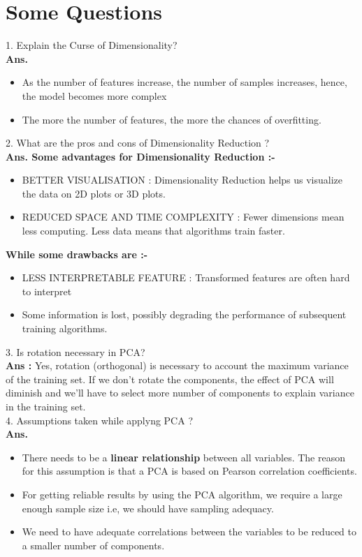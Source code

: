 \documentclass[a4paper, 11pt]{article}
\begin{document}
\section{Some Questions}
1. Explain the Curse of Dimensionality?\\
\textbf{Ans.}  \begin{itemize}
    \item  As the number of features increase, the number of samples increases, hence, the model becomes more complex
    \item The more the number of features, the more the chances of overfitting. 
\end{itemize}
2. What are the pros and cons of Dimensionality Reduction ? \\
\textbf{Ans. Some advantages for Dimensionality Reduction :-} 
\begin{itemize}
\item BETTER VISUALISATION : Dimensionality Reduction helps us visualize the data on 2D plots or 3D plots.
 \item REDUCED SPACE AND TIME COMPLEXITY : Fewer dimensions mean less computing. Less data means that algorithms train faster.
\end{itemize}
\pagebreak
\textbf{While some drawbacks are :-}
\begin{itemize}
    \item LESS INTERPRETABLE FEATURE : Transformed features are often hard to interpret
     \item Some information is lost, possibly degrading the performance of subsequent training algorithms.
    \end{itemize}
3. Is rotation necessary in PCA?\\ 
\textbf{Ans :} Yes, rotation (orthogonal) is necessary to account the maximum variance of the training set. 
If we don’t rotate the components, the effect of PCA will diminish and we’ll have to select more number of components to explain variance in the training set.\\
4.  Assumptions taken while applyng PCA ?  \\
\textbf{Ans.}
 \begin{itemize}
    \item There needs to be a \textbf{linear relationship} between all variables. The reason for this assumption is that a PCA is based on Pearson correlation coefficients.
    \item For getting reliable results by using the PCA algorithm, we require a large enough sample size i.e, we
    should have sampling adequacy.
    \item  We need to have adequate correlations between the
    variables to be reduced to a smaller number of components.
\end{itemize}
\end{document}
